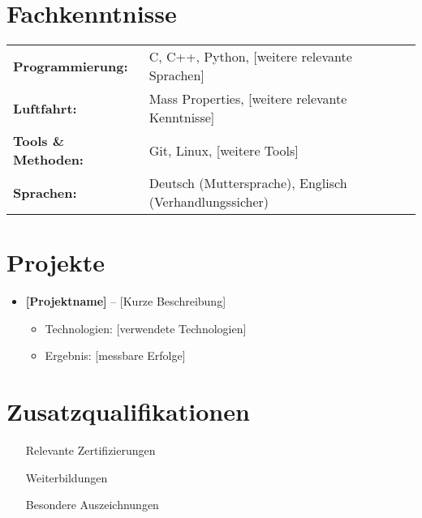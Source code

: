 \documentclass[a4paper,11pt]{article}
\begin{document}
\section{Fachkenntnisse}
\vspace{0.3cm}
\begin{tabularx}{\textwidth}{@{}l X@{}}
\textbf{Programmierung:} & C, C++, Python, [weitere relevante Sprachen]\\[0.2cm]
\textbf{Luftfahrt:} & Mass Properties, [weitere relevante Kenntnisse]\\[0.2cm]
\textbf{Tools \& Methoden:} & Git, Linux, [weitere Tools]\\[0.2cm]
\textbf{Sprachen:} & Deutsch (Muttersprache), Englisch (Verhandlungssicher)
\end{tabularx}

\section{Projekte}
\vspace{0.3cm}
\begin{itemize}[leftmargin=*]
    \item \textbf{[Projektname]} -- [Kurze Beschreibung]
    \begin{itemize}
        \item Technologien: [verwendete Technologien]
        \item Ergebnis: [messbare Erfolge]
    \end{itemize}
\end{itemize}

\section{Zusatzqualifikationen}
\vspace{0.3cm}
\begin{itemize}[leftmargin=*]
    \item [Relevante Zertifizierungen]
    \item [Weiterbildungen]
    \item [Besondere Auszeichnungen]
\end{itemize}
\end{document}
